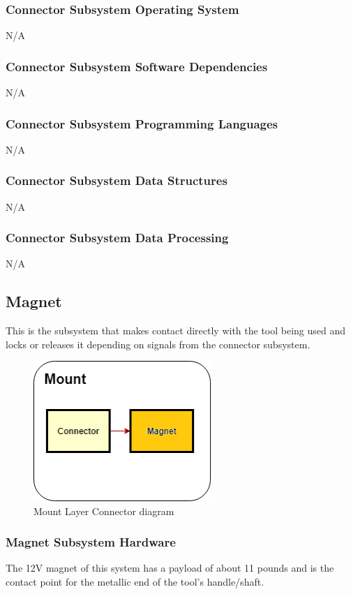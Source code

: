 \subsubsection{Connector Subsystem Operating System}
N/A

\subsubsection{Connector Subsystem Software Dependencies}
N/A

\subsubsection{Connector Subsystem Programming Languages}
N/A

\subsubsection{Connector Subsystem Data Structures}
N/A

\subsubsection{Connector Subsystem Data Processing}
N/A

\subsection{Magnet}
This is the subsystem that makes contact directly with the tool being used and locks or releases it depending on signals from the connector subsystem.

\begin{figure}[h!]
	\centering
 	\includegraphics[width=0.60\textwidth]{images/Mount_Layer_Magnet}
 \caption{Mount Layer Connector diagram}
\end{figure}

\subsubsection{Magnet Subsystem Hardware}
The 12V magnet of this system has a payload of about 11 pounds and is the contact point for the metallic end of the tool's handle/shaft.

